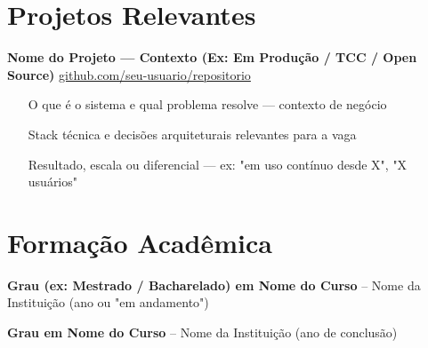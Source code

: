 \documentclass[a4paper,10pt]{article}
\begin{document}
\section*{Projetos Relevantes}

\textbf{Nome do Projeto --- Contexto (Ex: Em Produção / TCC / Open Source)} \hfill
\href{https://github.com/seu-usuario/repositorio}{github.com/seu-usuario/repositorio}

\begin{itemize}[leftmargin=*, noitemsep]
  \item [O que é o sistema e qual problema resolve --- contexto de negócio]
  \item [Stack técnica e decisões arquiteturais relevantes para a vaga]
  \item [Resultado, escala ou diferencial --- ex: "em uso contínuo desde X", "X usuários"]
\end{itemize}

\vspace{3pt}



%
%

\section*{Formação Acadêmica}

\textbf{Grau (ex: Mestrado / Bacharelado) em Nome do Curso} -- Nome da Instituição (ano ou "em andamento")

\textbf{Grau em Nome do Curso} -- Nome da Instituição (ano de conclusão)
\end{document}
